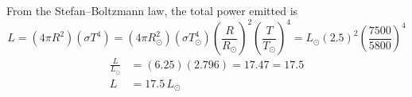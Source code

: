 From the Stefan--Boltzmann law, the total power emitted is
\[
  L = \left(4\pi R^2\right)\left(\sigma T^4\right)
    = \left(4\pi R_\odot^2\right)\left(\sigma T_\odot^4\right)
      \left(\frac{R}{R_\odot}\right)^{\!2}\left(\frac{T}{T_\odot}\right)^{\!4}
    = L_\odot \left(2.5\right)^2 \left(\frac{7500}{5800}\right)^{\!4}
\]
\begin{align*}
  \frac{L}{L_\odot} &= \left(6.25\right)\left(2.796\right) = 17.47 = 17.5 \\
  L &= 17.5\,L_\odot
\end{align*}

